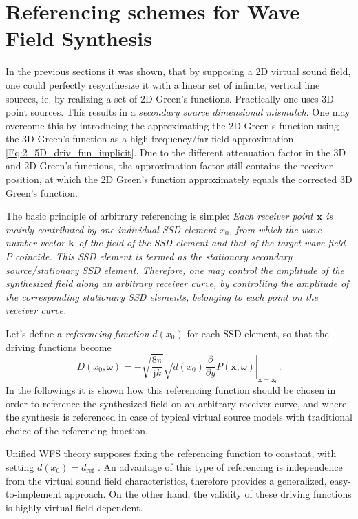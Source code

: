\documentclass[12pt,a4paper]{article}
\newcommand{\ti}{\mathrm{j}}
\newcommand{\dref}{d_{\mathrm{ref}}}
\newcommand{\vx}{\mathbf{x}}
\newcommand{\vxo}{\mathbf{x}_0}
\begin{document}
\section{Referencing schemes for Wave Field Synthesis}

In the previous sections it was shown, that by supposing a 2D virtual sound field, one could perfectly resynthesize it with a linear set of infinite, vertical line sources, ie. by realizing a set of 2D Green's functions. Practically one uses 3D point sources. This results in a \emph{secondary source dimensional mismatch}. One may overcome this by introducing the approximating the 2D Green's function using the 3D Green's function as a high-frequency/far field approximation \eqref{Eq:2_5D_driv_fun_implicit}.
Due to the different attenuation factor in the 3D and 2D Green's functions, the approximation factor still contains the receiver position, at which the 2D Green's function approximately equals the corrected 3D Green's function. 

The basic principle of arbitrary referencing is simple:
\emph{Each receiver point $\vx$ is mainly contributed by one individual SSD element $x_0$, from which the wave number vector ${\bf k}$ of the field of the SSD element and that of the target wave field $P$ coincide. This SSD element is termed as the stationary secondary source/stationary SSD element.
Therefore, one may control the amplitude of the synthesized field along an arbitrary receiver curve, by controlling the amplitude of the corresponding stationary SSD elements, belonging to each point on the receiver curve.}
 
\vspace{3mm}
Let's define a \emph{referencing function} $d(x_0)$ for each SSD element, so that the driving functions become
\begin{equation}
D(x_0,\omega) = 
- \sqrt{\frac{8\pi}{\ti k}} \sqrt{d(x_0)} \left. \frac{\partial}{\partial y} P(\vx,\omega) \right|_{\vx = \vxo}.
\label{Eq:Gen_rayleigh_dx0}
\end{equation}
In the followings it is shown how this referencing function should be chosen in order to reference the synthesized field on an arbitrary receiver curve, and where the synthesis is referenced in case of typical virtual source models with traditional choice of the referencing function.

Unified WFS theory supposes fixing the referencing function to constant, with setting $d(x_0) = \dref$ \cite{Ahrens2012}.
An advantage of this type of referencing is independence from the virtual sound field characteristics, therefore provides a generalized, easy-to-implement approach. On the other hand, the validity of these driving functions is highly virtual field dependent.
\end{document}
